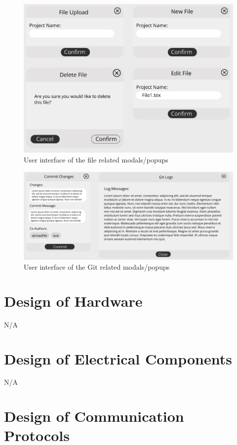 \documentclass[12pt, titlepage]{article}
\begin{document}
	\begin{figure}[H]
		\centering
		\includegraphics[width=\linewidth]{fileModals.png}
		\caption{User interface of the file related modals/popups}
	\end{figure}
	
	\begin{figure}[H]
		\centering
		\includegraphics[width=\linewidth]{gitModals.png}
		\caption{User interface of the Git related modals/popups}
	\end{figure}
	
	\section{Design of Hardware}
	
	N/A
	
	\section{Design of Electrical Components}
	
	N/A
	
	\section{Design of Communication Protocols}
	
\end{document}
